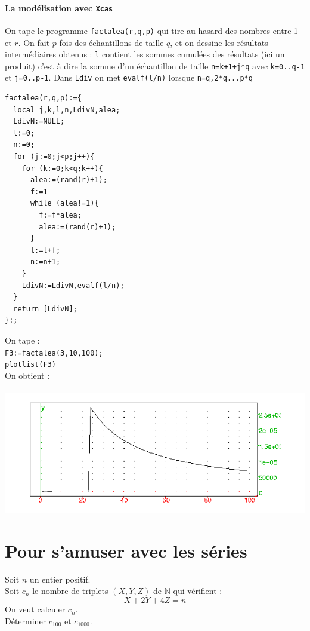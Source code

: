 \documentclass[a4paper,11pt]{book}
\begin{document}
\subsubsection{La mod\'elisation avec {\tt Xcas}}
On tape le programme {\tt factalea(r,q,p)} qui tire au hasard des nombres entre
1 et $r$. On fait $p$ fois des \'echantillons de taille $q$, et on dessine
les r\'esultats interm\'ediaires obtenus :
{\tt l} contient les sommes cumul\'ees des r\'esultats (ici un produit) c'est 
\`a dire la 
somme d'un \'echantillon de taille {\tt n=k+1+j*q} avec  {\tt k=0..q-1} et
{\tt j=0..p-1}. Dans {\tt Ldiv} on met {\tt evalf(l/n)}  lorsque 
{\tt n=q,2*q...p*q} 
\begin{verbatim}
factalea(r,q,p):={
  local j,k,l,n,LdivN,alea;
  LdivN:=NULL;
  l:=0;
  n:=0;
  for (j:=0;j<p;j++){
    for (k:=0;k<q;k++){
      alea:=(rand(r)+1);
      f:=1
      while (alea!=1){
        f:=f*alea;
        alea:=(rand(r)+1);
      }
      l:=l+f;
      n:=n+1;
    }
    LdivN:=LdivN,evalf(l/n);
  }
  return [LdivN];
}:;
\end{verbatim}
On tape :\\
{\tt F3:=factalea(3,10,100);}\\
{\tt plotlist(F3)}\\
On obtient :\\
\ \\
 \includegraphics[width=\textwidth]{factalea}
\chapter{Pour s'amuser avec les s\'eries}
Soit $n$ un entier positif. \\
Soit $c_n$ le nombre de triplets $(X,Y,Z)$ de 
$\mathbb N$ qui v\'erifient :
$$X+2Y+4Z=n$$
On veut calculer $c_n$.\\
D\'eterminer $c_{100}$ et $c_{1000}$.\\
\end{document}
